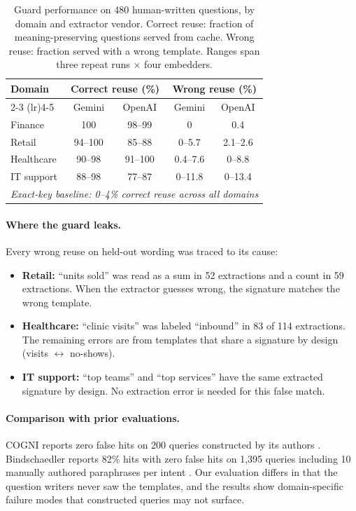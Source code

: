 \documentclass[11pt,a4paper]{article}
\begin{document}
\begin{table}[t]
\centering
\caption{Guard performance on 480 human-written questions, by domain and
extractor vendor. Correct reuse: fraction of meaning-preserving questions
served from cache. Wrong reuse: fraction served with a wrong template.
Ranges span three repeat runs $\times$ four embedders.}
\label{tab:guard}
\small
\begin{tabular}{@{}lcccc@{}}
\toprule
Domain & \multicolumn{2}{c}{Correct reuse (\%)} & \multicolumn{2}{c}{Wrong reuse (\%)} \\
\cmidrule(lr){2-3} \cmidrule(lr){4-5}
       & Gemini & OpenAI & Gemini & OpenAI \\
\midrule
Finance    & 100      & 98--99 &  0     & 0.4   \\
Retail     & 94--100  & 85--88 & 0--5.7 & 2.1--2.6 \\
Healthcare & 90--98   & 91--100 & 0.4--7.6 & 0--8.8 \\
IT support & 88--98   & 77--87 & 0--11.8 & 0--13.4 \\
\midrule
\multicolumn{5}{l}{\textit{Exact-key baseline: 0--4\% correct reuse across all domains}} \\
\bottomrule
\end{tabular}
\end{table}

\paragraph{Where the guard leaks.} Every wrong reuse on held-out wording
was traced to its cause:

\begin{itemize}[leftmargin=*,itemsep=1pt]
\item \textbf{Retail:} ``units sold'' was read as a sum in 52 extractions
      and a count in 59 extractions. When the extractor guesses wrong, the
      signature matches the wrong template.
\item \textbf{Healthcare:} ``clinic visits'' was labeled ``inbound'' in
      83 of 114 extractions. The remaining errors are from templates that
      share a signature by design (visits $\leftrightarrow$ no-shows).
\item \textbf{IT support:} ``top teams'' and ``top services'' have the
      same extracted signature by design. No extraction error is needed
      for this false match.
\end{itemize}

\paragraph{Comparison with prior evaluations.} COGNI reports zero false
hits on 200 queries constructed by its authors
\cite{rathore2026cogni}. Bindschaedler reports 82\% hits with zero false
hits on 1,395 queries including 10 manually authored paraphrases per
intent \cite{bindschaedler2026semantic}. Our evaluation differs in that
the question writers never saw the templates, and the results show
domain-specific failure modes that constructed queries may not surface.
\end{document}
